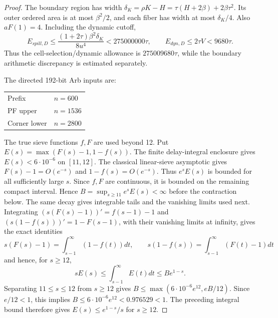 \begin{proof}
The boundary region has width
$\delta_K=\rho K-H=\tau(H+2\beta)+2\beta\tau^2.$
Its outer ordered area is at most $\beta^2/2$, and each fiber has width at most $\delta_K/4$.
Also $aF(1)=4$.
Including the dynamic cutoff,
\[
 E_{spill,D}\le\frac{(1+2\tau)\beta^2\delta_K}{8u^4}
 <275000000\tau,\qquad E_{dyn,D}\le2\tau V<9680\tau.
 \tag{3.21}
\]
Thus the cell-selection/dynamic allowance is $275009680\tau$,
while the boundary arithmetic discrepancy is estimated separately.

The directed 192-bit Arb inputs \cite{Johansson2017} are:
\begin{center}
\begin{tabular}{@{}ll@{}}
Prefix & $n=600$ \\
PF upper & $n=1536$ \\
Corner lower & $n=2800$
\end{tabular}
\end{center}
The true sieve functions $f,F$ are used beyond 12.
Put $E(s)=\max(F(s)-1,1-f(s))$.
The finite delay-integral enclosure gives $E(s)<6\cdot10^{-6}$ on $[11,12]$.
The classical linear-sieve asymptotic gives
$F(s)-1=O(e^{-s})$ and $1-f(s)=O(e^{-s})$.
Thus $e^sE(s)$ is bounded for all sufficiently large $s$.
Since $f,F$ are continuous, it is bounded on the remaining compact interval.
Hence $B=\sup_{s\ge11}e^sE(s)<\infty$ before the contraction below.
The same decay gives integrable tails and the vanishing limits used next.
Integrating $(s(F(s)-1))'=f(s-1)-1$ and
$(s(1-f(s)))'=1-F(s-1)$, with their vanishing limits at infinity,
gives the exact identities
\[
 s(F(s)-1)=\int_{s-1}^\infty(1-f(t))dt,\qquad
 s(1-f(s))=\int_{s-1}^\infty(F(t)-1)dt
\]
and hence, for $s\ge12$,
\[
 sE(s)\le\int_{s-1}^\infty E(t)dt\le Be^{1-s}.
\]
Separating $11\le s\le12$ from $s\ge12$ gives
$B\le\max(6\cdot10^{-6}e^{12},eB/12)$.
Since $e/12<1$, this implies
$B\le6\cdot10^{-6}e^{12}<0.976529<1$.
The preceding integral bound therefore gives
$E(s)\le e^{1-s}/s$ for $s\ge12$.


\end{proof}
